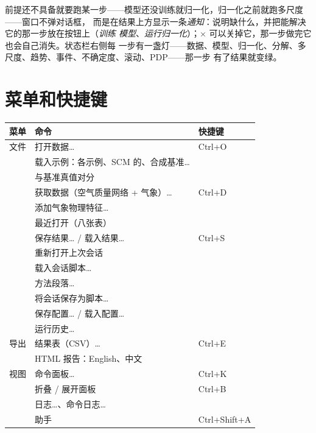 \documentclass[11pt]{ctexrep}
\begin{document}
前提还不具备就要跑某一步——模型还没训练就归一化，归一化之前就跑多尺度——窗口不弹对话框，
而是在结果上方显示一条\emph{通知}：说明缺什么，并把能解决它的那一步放在按钮上（\emph{训练
模型}、\emph{运行归一化}）；\(\times\) 可以关掉它，那一步做完它也会自己消失。状态栏右侧每
一步有一盏灯——数据、模型、归一化、分解、多尺度、趋势、事件、不确定度、滚动、PDP——那一步
有了结果就变绿。

\section{菜单和快捷键}
\begin{center}\small
\begin{tabular}{@{}lll@{}}
\toprule
菜单 & 命令 & 快捷键 \\
\midrule
文件     & 打开数据…                            & Ctrl+O \\
         & 载入示例：各示例、SCM 的、合成基准…   & \\
         & 与基准真值对分                        & \\
         & 获取数据（空气质量网络 + 气象）…     & Ctrl+D \\
         & 添加气象物理特征…                    & \\
         & 最近打开（八张表）                   & \\
         & 保存结果… / 载入结果…                & Ctrl+S \\
         & 重新打开上次会话                     & \\
         & 载入会话脚本…                        & \\
         & 方法段落…                            & \\
         & 将会话保存为脚本…                    & \\
         & 保存配置… / 载入配置…                & \\
         & 运行历史…                            & \\
导出     & 结果表（CSV）…                        & Ctrl+E \\
         & HTML 报告：English、中文             & \\
视图     & 命令面板…                            & Ctrl+K \\
         & 折叠 / 展开面板                      & Ctrl+B \\
         & 日志…、命令日志…                     & \\
         & 助手                                 & Ctrl+Shift+A \\

\end{tabular}
\end{center}
\end{document}
